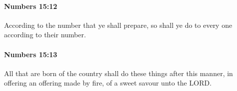 		\paragraph{Numbers 15:12} %
			\label{NUMBERS-15-12}

			According to the number that ye shall prepare, so shall ye do to every one according to their number.


		\paragraph{Numbers 15:13} %
			\label{NUMBERS-15-13}

			All that are born of the country shall do these things after this manner, in offering an offering made by fire, of a sweet savour unto the LORD.


